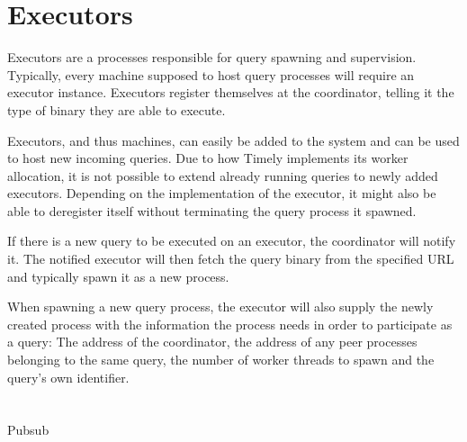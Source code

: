 \section{Executors}

Executors are a processes responsible for query spawning and supervision. Typically,
every machine supposed to host query processes will require an executor
instance. Executors register themselves at the coordinator, telling it the type
of binary they are able to execute. 

Executors, and thus machines, can easily be added to the system and can be used
to host new incoming queries. Due to how Timely implements its worker allocation,
it is not possible to extend already running queries to newly added executors.
Depending on the implementation of the executor, it might also be able to
deregister itself without terminating the query process it spawned.

If there is a new query to be executed on an executor, the coordinator will notify
it. The notified executor will then fetch the query binary from the specified URL
and typically spawn it as a new process.

When spawning a new query process, the executor will also supply the newly created
process with the information the process needs in order to participate as a query:
The address of the coordinator, the address of any peer processes belonging to the 
same query, the number of worker threads to spawn and the query's own identifier.

\section{}

Pubsub
